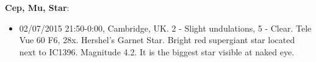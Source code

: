 {\bf Cep, Mu, Star}:
\begin{itemize}
\item 02/07/2015 21:50-0:00, Cambridge, UK. 2 - Slight undulations, 5 - Clear. Tele Vue 60 F6, 28x. Hershel's Garnet Star. Bright red supergiant star located next to IC1396. Magnitude 4.2. It is the biggest star visible at naked eye.
\end{itemize}
